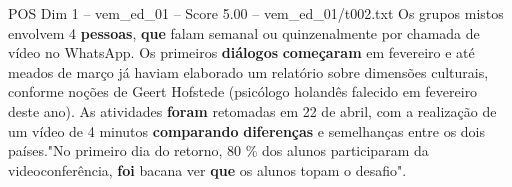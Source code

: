 \begin{textsample}{POS Dim 1 – vem\_ed\_01 – Score 5.00 – vem\_ed\_01/t002.txt}
Os grupos mistos envolvem 4 \textbf{pessoas}, \textbf{que} falam semanal ou quinzenalmente por chamada de vídeo no WhatsApp.
Os primeiros \textbf{diálogos} \textbf{começaram} em fevereiro e até meados de março já haviam elaborado um relatório sobre dimensões culturais, conforme noções de Geert Hofstede (psicólogo holandês falecido em fevereiro deste ano).
As atividades \textbf{foram} retomadas em 22 de abril, com a realização de um vídeo de 4 minutos \textbf{comparando} \textbf{diferenças} e semelhanças entre os dois países."No primeiro dia do retorno, 80 \% dos alunos participaram da videoconferência, \textbf{foi} bacana ver \textbf{que} os alunos topam o desafio".

\end{textsample}
